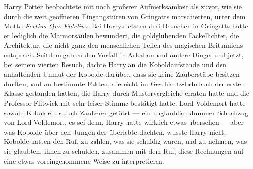 Harry Potter beobachtete mit noch größerer Aufmerksamkeit als zuvor, wie sie durch die weit geöffneten Eingangstüren von Gringotts marschierten, unter dem Motto \emph{Fortius Quo Fidelius}. Bei Harrys letzten drei Besuchen in Gringotts hatte er lediglich die Marmorsäulen bewundert, die goldglühenden Fackellichter, die Architektur, die nicht ganz den menschlichen Teilen des magischen Britanniens entsprach. Seitdem gab es den Vorfall in Askaban und andere Dinge; und jetzt, bei seinem vierten Besuch, dachte Harry an die Koboldaufstände und den anhaltenden Unmut der Kobolde darüber, dass sie keine Zauberstäbe besitzen durften, und an bestimmte Fakten, die nicht im Geschichts-Lehrbuch der ersten Klasse gestanden hatten, die Harry durch Mustervergleiche erraten hatte und die Professor Flitwick mit sehr leiser Stimme bestätigt hatte. Lord Voldemort hatte sowohl Kobolde als auch Zauberer getötet — ein unglaublich dummer Schachzug von Lord Voldemort, es sei denn, Harry hatte wirklich etwas übersehen — aber was Kobolde über den Jungen-der-überlebte dachten, wusste Harry nicht. Kobolde hatten den Ruf, zu zahlen, was sie schuldig waren, und zu nehmen, was sie glaubten, ihnen zu schulden, zusammen mit dem Ruf, diese Rechnungen auf eine etwas voreingenommene Weise zu interpretieren.

